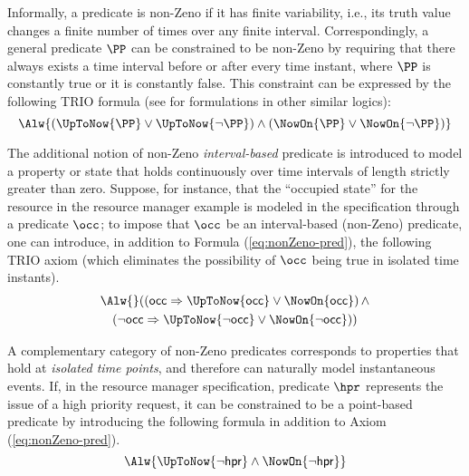 Informally, a predicate is non-Zeno if it has finite variability,
i.e., its truth value changes a finite number of times over any finite
interval. Correspondingly, a general predicate $\PP$ can be
constrained to be non-Zeno by requiring that there always exists a
time interval before or after every time instant, where $\PP$ is
constantly true or it is constantly false. This constraint can be
expressed by the following TRIO formula (see \cite{HR04,LWW07} for
formulations in other similar logics):
\begin{equation} \label{eq:nonZeno-pred}
  \Alw{ \left( \UpToNow{\PP} \vee \UpToNow{\neg \PP}\right) \wedge \left( \NowOn{\PP} \vee \NowOn{\neg \PP} \right)}
\end{equation}

The additional notion of non-Zeno \emph{interval-based} predicate 
is introduced to model a property or state that holds continuously 
over time intervals of length strictly greater than zero. Suppose, 
for instance, that the ``occupied state'' for the resource in 
the resource manager example is modeled in the specification 
through a predicate $\occ$; to impose that $\occ$ be an interval-based 
(non-Zeno) predicate, one can introduce, in addition to Formula (\ref{eq:nonZeno-pred}),
the following TRIO axiom (which eliminates the possibility 
of $\occ$ being true in isolated time instants). 
\begin{multline*}
  \Alw{} ( \left( \mathsf{occ} \Rightarrow \UpToNow{\mathsf{occ}} \vee \NowOn{\mathsf{occ}} \right) \wedge \\ \left( \neg \mathsf{occ} \Rightarrow \UpToNow{\neg \mathsf{occ}} \vee \NowOn{\neg \mathsf{occ}} \right) )
\end{multline*}

A complementary category of non-Zeno predicates corresponds to 
properties that hold at \emph{isolated time points}, and therefore 
can naturally model instantaneous events. If, in the resource 
manager specification, predicate $\hpr$ represents the issue 
of a high priority request, it can be constrained to be a point-based 
predicate by introducing the following formula in addition to 
Axiom (\ref{eq:nonZeno-pred}). 
\begin{equation*}
  \Alw{\UpToNow{\neg \mathsf{hpr}} \wedge \NowOn{\neg \mathsf{hpr}}}
\end{equation*}

